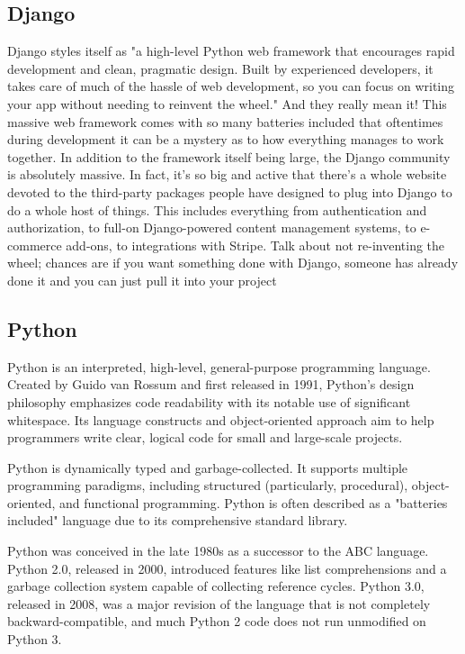 \documentclass[oneside,12pt]{Classes/VTU}
\begin{document}
	\subsection{Django}
	Django styles itself as "a high-level Python web framework that encourages rapid development and clean, pragmatic design. Built by experienced developers, it takes care of much of the hassle of web development, so you can focus on writing your app without needing to reinvent the wheel." And they really mean it! This massive web framework comes with so many batteries included that oftentimes during development it can be a mystery as to how everything manages to work together. In addition to the framework itself being large, the Django community is absolutely massive. In fact, it's so big and active that there's a whole website devoted to the third-party packages people have designed to plug into Django to do a whole host of things. This includes everything from authentication and authorization, to full-on Django-powered content management systems, to e-commerce add-ons, to integrations with Stripe. Talk about not re-inventing the wheel; chances are if you want something done with Django, someone has already done it and you can just pull it into your project
	\subsection{Python}
	Python is an interpreted, high-level, general-purpose programming language. Created by Guido van Rossum and first released in 1991, Python's design philosophy emphasizes code readability with its notable use of significant whitespace. Its language constructs and object-oriented approach aim to help programmers write clear, logical code for small and large-scale projects.

Python is dynamically typed and garbage-collected. It supports multiple programming paradigms, including structured (particularly, procedural), object-oriented, and functional programming. Python is often described as a "batteries included" language due to its comprehensive standard library.

Python was conceived in the late 1980s as a successor to the ABC language. Python 2.0, released in 2000, introduced features like list comprehensions and a garbage collection system capable of collecting reference cycles. Python 3.0, released in 2008, was a major revision of the language that is not completely backward-compatible, and much Python 2 code does not run unmodified on Python 3.
\end{document}
